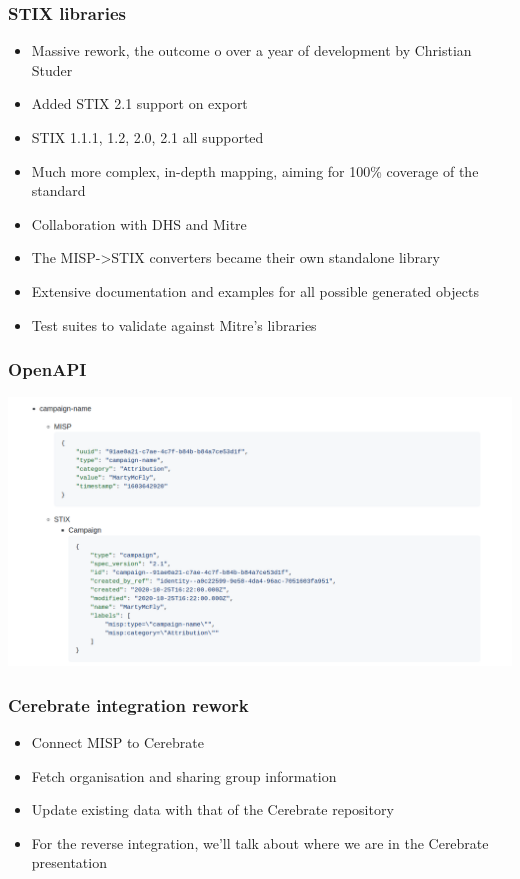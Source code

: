 \begin{frame}
  \frametitle{STIX libraries}
  \begin{itemize}
     \item Massive rework, the outcome o over a year of development by Christian Studer
     \item Added STIX 2.1 support on export
     \item STIX 1.1.1, 1.2, 2.0, 2.1 all supported
     \item Much more complex, in-depth mapping, aiming for 100\% coverage of the standard
     \item Collaboration with DHS and Mitre
     \item The MISP->STIX converters became their own standalone library
     \item Extensive documentation and examples for all possible generated objects
     \item Test suites to validate against Mitre's libraries
  \end{itemize}
\end{frame}

\begin{frame}
\frametitle{OpenAPI}
\includegraphics[scale=0.18]{images/stix.png}
\end{frame}

\begin{frame}
  \frametitle{Cerebrate integration rework}
  \begin{itemize}
     \item Connect MISP to Cerebrate
     \item Fetch organisation and sharing group information
     \item Update existing data with that of the Cerebrate repository
     \item For the reverse integration, we'll talk about where we are in the Cerebrate presentation
  \end{itemize}
\end{frame}


